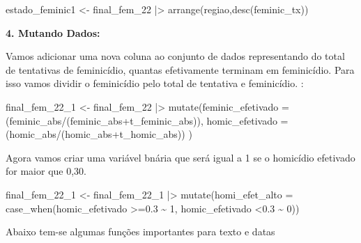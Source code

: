 \documentclass[
  letterpaper,
  DIV=11,
  numbers=noendperiod]{scrreprt}
\newenvironment{Shaded}{\begin{snugshade}}{\end{snugshade}}
\newcommand{\AttributeTok}[1]{\textcolor[rgb]{0.40,0.45,0.13}{#1}}
\newcommand{\DecValTok}[1]{\textcolor[rgb]{0.68,0.00,0.00}{#1}}
\newcommand{\FloatTok}[1]{\textcolor[rgb]{0.68,0.00,0.00}{#1}}
\newcommand{\FunctionTok}[1]{\textcolor[rgb]{0.28,0.35,0.67}{#1}}
\newcommand{\NormalTok}[1]{\textcolor[rgb]{0.00,0.23,0.31}{#1}}
\newcommand{\OtherTok}[1]{\textcolor[rgb]{0.00,0.23,0.31}{#1}}
\newcommand{\SpecialCharTok}[1]{\textcolor[rgb]{0.37,0.37,0.37}{#1}}
\begin{document}
\begin{Shaded}
\begin{Highlighting}[]
\NormalTok{estado\_feminic1 }\OtherTok{\textless{}{-}}\NormalTok{ final\_fem\_22 }\SpecialCharTok{|\textgreater{}} 
  \FunctionTok{arrange}\NormalTok{(regiao,}\FunctionTok{desc}\NormalTok{(feminic\_tx))}
\end{Highlighting}
\end{Shaded}

\textbf{4. Mutando Dados:}

Vamos adicionar uma nova coluna ao conjunto de dados representando do
total de tentativas de feminicídio, quantas efetivamente terminam em
feminicídio. Para isso vamos dividir o feminicídio pelo total de
tentativa e feminicídio. :

\begin{Shaded}
\begin{Highlighting}[]
\NormalTok{final\_fem\_22\_1 }\OtherTok{\textless{}{-}}\NormalTok{ final\_fem\_22 }\SpecialCharTok{|\textgreater{}} 
  \FunctionTok{mutate}\NormalTok{(}\AttributeTok{feminic\_efetivado =}\NormalTok{(feminic\_abs}\SpecialCharTok{/}\NormalTok{(feminic\_abs}\SpecialCharTok{+}\NormalTok{t\_feminic\_abs)),  }\AttributeTok{homic\_efetivado =}\NormalTok{(homic\_abs}\SpecialCharTok{/}\NormalTok{(homic\_abs}\SpecialCharTok{+}\NormalTok{t\_homic\_abs)) )}
\end{Highlighting}
\end{Shaded}

Agora vamos criar uma variável bnária que será igual a 1 se o homicídio
efetivado for maior que 0,30.

\begin{Shaded}
\begin{Highlighting}[]
\NormalTok{final\_fem\_22\_1 }\OtherTok{\textless{}{-}}\NormalTok{ final\_fem\_22\_1 }\SpecialCharTok{|\textgreater{}}  
  \FunctionTok{mutate}\NormalTok{(}\AttributeTok{homi\_efet\_alto =} \FunctionTok{case\_when}\NormalTok{(homic\_efetivado }\SpecialCharTok{\textgreater{}=}\FloatTok{0.3} \SpecialCharTok{\textasciitilde{}} \DecValTok{1}\NormalTok{,}
\NormalTok{                             homic\_efetivado }\SpecialCharTok{\textless{}}\FloatTok{0.3} \SpecialCharTok{\textasciitilde{}} \DecValTok{0}\NormalTok{))}
\end{Highlighting}
\end{Shaded}

Abaixo tem-se algumas funções importantes para texto e datas
\end{document}
